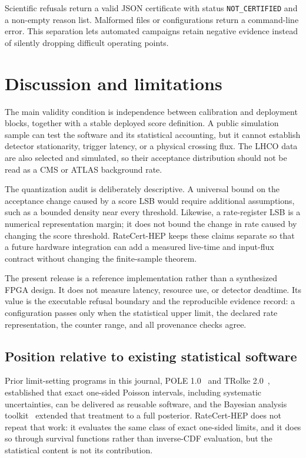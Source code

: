 \documentclass[preprint,12pt]{elsarticle}
\begin{document}
Scientific refusals return a valid JSON certificate with status
\verb|NOT_CERTIFIED| and a non-empty reason list.  Malformed files or configurations
return a command-line error.  This separation lets automated campaigns retain
negative evidence instead of silently dropping difficult operating points.

\section{Discussion and limitations}
\label{sec:discussion}

The main validity condition is independence between calibration and deployment
blocks, together with a stable deployed score definition.  A public simulation
sample can test the software and its statistical accounting, but it cannot
establish detector stationarity, trigger latency, or a physical crossing flux.
The LHCO data are also selected and simulated, so their acceptance distribution
should not be read as a CMS or ATLAS background rate.

The quantization audit is deliberately descriptive.  A universal bound on the
acceptance change caused by a score LSB would require additional assumptions,
such as a bounded density near every threshold.  Likewise, a rate-register LSB
is a numerical representation margin; it does not bound the change in rate
caused by changing the score threshold.  RateCert-HEP keeps these claims
separate so that a future hardware integration can add a measured live-time and
input-flux contract without changing the finite-sample theorem.

The present release is a reference implementation rather than a synthesized
FPGA design.  It does not measure latency, resource use, or detector deadtime.
Its value is the executable refusal boundary and the reproducible evidence
record: a configuration passes only when the statistical upper limit, the
declared rate representation, the counter range, and all provenance checks
agree.

\subsection{Position relative to existing statistical software}

Prior limit-setting programs in this journal, POLE 1.0~\cite{Conrad2004POLE}
and TRolke 2.0~\cite{Lundberg2010TRolke}, established that exact one-sided
Poisson intervals, including systematic uncertainties, can be delivered as
reusable software, and the Bayesian analysis toolkit~\cite{BAT2009} extended
that treatment to a full posterior.  RateCert-HEP does not repeat that work:
it evaluates the same class of exact one-sided limits, and it does so through
survival functions rather than inverse-CDF evaluation, but the statistical
content is not its contribution.
\end{document}

